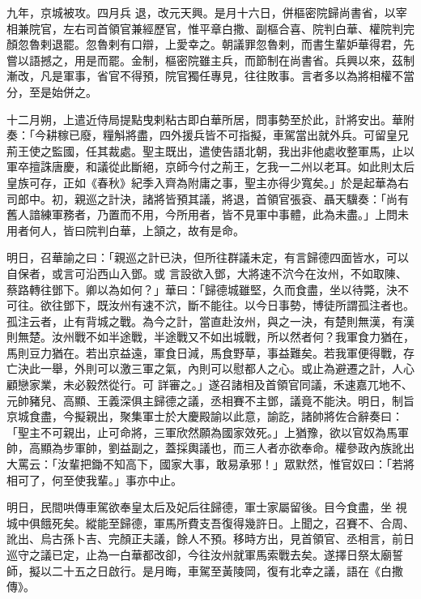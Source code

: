 \begin{pinyinscope}
 九年，京城被攻。四月兵
 退，改元天興。是月十六日，併樞密院歸尚書省，以宰相兼院官，左右司首領官兼經歷官，惟平章白撒、副樞合喜、院判白華、權院判完顏忽魯剌退罷。忽魯剌有口辯，上愛幸之。朝議罪忽魯剌，而書生輩妒華得君，先嘗以語撼之，用是而罷。金制，樞密院雖主兵，而節制在尚書省。兵興以來，茲制漸改，凡是軍事，省官不得預，院官獨任專見，往往敗事。言者多以為將相權不當分，至是始併之。



 十二月朔，上遣近侍局提點曳剌粘古即白華所居，問事勢至於此，計將安出。華附奏：「今耕稼已廢，糧斛將盡，四外援兵皆不可指擬，車駕當出就外兵。可留皇兄
 荊王使之監國，任其裁處。聖主既出，遣使告語北朝，我出非他處收整軍馬，止以軍卒擅誅唐慶，和議從此斷絕，京師今付之荊王，乞我一二州以老耳。如此則太后皇族可存，正如《春秋》紀季入齊為附庸之事，聖主亦得少寬矣。」於是起華為右司郎中。初，親巡之計決，諸將皆預其議，將退，首領官張袞、聶天驥奏：「尚有舊人諳練軍務者，乃置而不用，今所用者，皆不見軍中事體，此為未盡。」上問未用者何人，皆曰院判白華，上頷之，故有是命。



 明日，召華諭之曰：「親巡之計已決，但所往群議未定，有言歸德四面皆水，可以自保者，或言可沿西山入鄧。或
 言設欲入鄧，大將速不泬今在汝州，不如取陳、蔡路轉往鄧下。卿以為如何？」華曰：「歸德城雖堅，久而食盡，坐以待斃，決不可往。欲往鄧下，既汝州有速不泬，斷不能往。以今日事勢，博徒所謂孤注者也。孤注云者，止有背城之戰。為今之計，當直赴汝州，與之一決，有楚則無漢，有漢則無楚。汝州戰不如半途戰，半途戰又不如出城戰，所以然者何？我軍食力猶在，馬則豆力猶在。若出京益遠，軍食日減，馬食野草，事益難矣。若我軍便得戰，存亡決此一舉，外則可以激三軍之氣，內則可以慰都人之心。或止為避遷之計，人心顧戀家業，未必毅然從行。可
 詳審之。」遂召諸相及首領官同議，禾速嘉兀地不、元帥豬兒、高顯、王義深俱主歸德之議，丞相賽不主鄧，議竟不能決。明日，制旨京城食盡，今擬親出，聚集軍士於大慶殿諭以此意，諭訖，諸帥將佐合辭奏曰：「聖主不可親出，止可命將，三軍欣然願為國家效死。」上猶豫，欲以官奴為馬軍帥，高顯為步軍帥，劉益副之，蓋採輿議也，而三人者亦欲奉命。權參政內族訛出大罵云：「汝輩把鋤不知高下，國家大事，敢易承邪！」眾默然，惟官奴曰：「若將相可了，何至使我輩。」事亦中止。



 明日，民間哄傳車駕欲奉皇太后及妃后往歸德，軍士家屬留後。目今食盡，坐
 視城中俱餓死矣。縱能至歸德，軍馬所費支吾復得幾許日。上聞之，召賽不、合周、訛出、烏古孫卜吉、完顏正夫議，餘人不預。移時方出，見首領官、丞相言，前日巡守之議已定，止為一白華都改卻，今往汝州就軍馬索戰去矣。遂擇日祭太廟誓師，擬以二十五之日啟行。是月晦，車駕至黃陵岡，復有北幸之議，語在《白撒傳》。




\end{pinyinscope}
